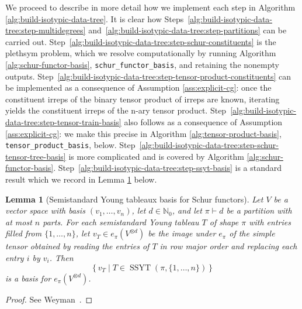 \documentclass[11pt]{article}
\newcommand{\dsN}{\mathbb{N}}
\newcommand{\SSYT}{\operatorname{SSYT}}
\newcommand{\set}[1]{\{#1\}}
\newtheorem{lemma}[theorem]{Lemma}
\theoremstyle{definition}
\begin{document}
We proceed to describe in more detail how we implement each step in Algorithm \ref{alg:build-isotypic-data-tree}. It is clear how Steps~\ref{alg:build-isotypic-data-tree:step-multidegrees} and~\ref{alg:build-isotypic-data-tree:step-partitions} can be carried out. Step~\ref{alg:build-isotypic-data-tree:step-schur-constituents} is the plethsym problem, which we resolve computationally by running Algorithm \ref{alg:schur-functor-basis}, \texttt{schur\_functor\_basis}, and retaining the nonempty outputs. Step~\ref{alg:build-isotypic-data-tree:step-tensor-product-constituents} can be implemented as a consequence of Assumption \ref{ass:explicit-cg}: once the constituent irreps of the binary tensor product of irreps are known, iterating yields the constituent irreps of the n-ary tensor product. Step~\ref{alg:build-isotypic-data-tree:step-tensor-train-basis} also follows as a consequence of Assumption \ref{ass:explicit-cg}: we make this precise in Algorithm \ref{alg:tensor-product-basis}, \texttt{tensor\_product\_basis}, below. Step~\ref{alg:build-isotypic-data-tree:step-schur-tensor-tree-basis} is more complicated and is covered by Algorithm \ref{alg:schur-functor-basis}. Step~\ref{alg:build-isotypic-data-tree:step-ssyt-basis} is a standard result which we record in Lemma \ref{lem:ssyt-basis} below.

\begin{lemma}[Semistandard Young tableaux basis for Schur functors]\label{lem:ssyt-basis}
  Let $V$ be a vector space with basis $(v_1,\dots,v_n)$, let $d \in \dsN_0$, and let $\pi\vdash d$ be a partition with at most $n$ parts. For each semistandard Young tableau $T$ of shape $\pi$ with entries filled from $\set{1,\dots,n}$, let $v_T\in e_\pi(V^{\otimes d})$ be the image under $e_\pi$ of the simple tensor obtained by reading the entries of $T$ in row major order and replacing each entry $i$ by $v_i$. Then
  \[
    \left\{v_T \mid T\in \SSYT(\pi,\set{1,\dots,n})\right\}
  \]
  is a basis for $e_\pi(V^{\otimes d})$.
\end{lemma}
\begin{proof}
  See Weyman~\cite[Proposition~2.1.15(b)]{Weyman2003}.
\end{proof}
\end{document}
